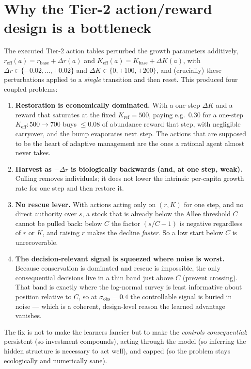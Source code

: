 \documentclass[11pt]{article}
\newcommand{\reff}{r_{\mathrm{eff}}}
\newcommand{\Keff}{K_{\mathrm{eff}}}
\newcommand{\rbase}{r_{\mathrm{base}}}
\newcommand{\Kbase}{K_{\mathrm{base}}}
\newcommand{\Kref}{K_{\mathrm{ref}}}
\newcommand{\sobs}{\sigma_{\mathrm{obs}}}
\begin{document}
\section{Why the Tier-2 action/reward design is a bottleneck}
\label{sec:diagnosis}
The executed Tier-2 action tables perturbed the growth parameters additively,
$\reff(a)=\rbase+\Delta r(a)$ and $\Keff(a)=\Kbase+\Delta K(a)$, with $\Delta r\in
\{-0.02,\dots,+0.02\}$ and $\Delta K\in\{0,+100,+200\}$, and (crucially) these
perturbations applied to a \emph{single} transition and then reset. This produced
four coupled problems:
\begin{enumerate}[leftmargin=1.6em,nosep]
\item \textbf{Restoration is economically dominated.} With a one-step $\Delta K$
and a reward that saturates at the fixed $\Kref{=}500$, paying e.g.\ $0.30$ for a
one-step $\Keff:500\!\to\!700$ buys $\le\!0.08$ of abundance reward that step, with
negligible carryover, and the bump evaporates next step. The actions that are
supposed to be the heart of adaptive management are the ones a rational agent
almost never takes.
\item \textbf{Harvest as $-\Delta r$ is biologically backwards (and, at one step,
weak).} Culling removes individuals; it does not lower the intrinsic per-capita
growth rate for one step and then restore it.
\item \textbf{No rescue lever.} With actions acting only on $(r,K)$ for one step,
and no direct authority over $s$, a stock that is already below the Allee threshold
$C$ cannot be pulled back: below $C$ the factor $(s/C-1)$ is negative regardless of
$r$ or $K$, and raising $r$ makes the decline \emph{faster}. So a low start below
$C$ is unrecoverable.
\item \textbf{The decision-relevant signal is squeezed where noise is worst.}
Because conservation is dominated and rescue is impossible, the only consequential
decisions live in a thin band just above $C$ (prevent crossing). That band is
exactly where the log-normal survey is least informative about position relative to
$C$, so at $\sobs{=}0.4$ the controllable signal is buried in noise --- which is a
coherent, design-level reason the learned advantage vanishes.
\end{enumerate}
The fix is not to make the learners fancier but to make the \emph{controls
consequential}: persistent (so investment compounds), acting through the model (so
inferring the hidden structure is necessary to act well), and capped (so the
problem stays ecologically and numerically sane).
\end{document}

